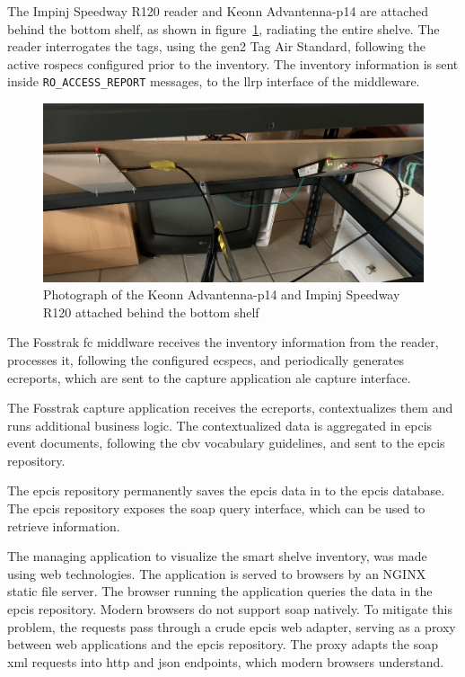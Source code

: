 The Impinj Speedway R120 reader and Keonn Advantenna-p14 are attached behind the bottom shelf, as shown in figure~\ref{fig:shelvephoto}, radiating the entire shelve.
The reader interrogates the tags, using the \ac{gen2} Tag Air Standard, following the active \acp{rospec} configured prior to the inventory.
The inventory information is sent inside \texttt{RO\_ACCESS\_REPORT} messages, to the \ac{llrp} interface of the middleware.

\begin{figure}
    \centering
    \includegraphics[width=\textwidth]{figs/completeshelve_photo.jpeg}
    \caption{Photograph of the Keonn Advantenna-p14 and Impinj Speedway R120 attached behind the bottom shelf}
    \label{fig:shelvephoto}
\end{figure}

The Fosstrak \ac{fc} middlware receives the inventory information from the reader, processes it, following the configured \acp{ecspec}, and periodically generates \acp{ecreport}, which are sent to the capture application \ac{ale} capture interface.

The Fosstrak capture application receives the \acp{ecreport}, contextualizes them and runs additional business logic. The contextualized data is aggregated in \acs{epcis} event documents, following the \ac{cbv} vocabulary guidelines, and sent to the \ac{epcis} repository.

The \ac{epcis} repository permanently saves the \ac{epcis} data in to the \ac{epcis} database. The \ac{epcis} repository exposes the \ac{soap} query interface, which can be used to retrieve information.

The managing application to visualize the smart shelve inventory, was made using web technologies. The application is served to browsers by an NGINX static file server. The browser running the application queries the data in the \ac{epcis} repository.
Modern browsers do not support \ac{soap} natively. 
To mitigate this problem, the requests pass through a crude \ac{epcis} web adapter, serving as a proxy between web applications and the \ac{epcis} repository. 
The proxy adapts the \ac{soap} \ac{xml} requests into \ac{http} and \ac{json} endpoints, which modern browsers understand.

